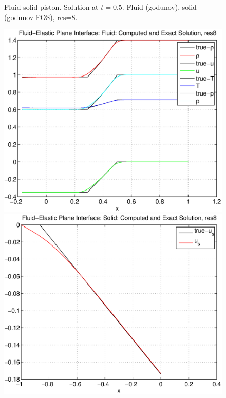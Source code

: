 {\begin{figure}[h]
\caption{Fluid-solid piston. Solution at $t=0.5$. Fluid (godunov), solid (godunov FOS), res=8.}
\label{fig:fluidSolidPistonFOSG8}
\end{figure}
% 
\begin{figure}[h]
\includegraphics[width=\fwidth]{fluidElastic_planeInterfacehFluid_res8.eps}
\includegraphics[width=\fwidth]{fluidElastic_planeInterfacehSolid_res8.eps}

\end{figure}}

